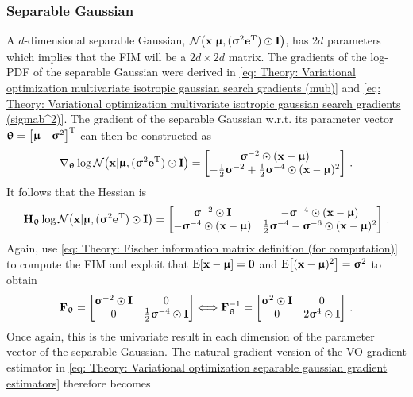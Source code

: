 \subsubsection{Separable Gaussian}
A $d$-dimensional separable Gaussian, $\mathcal{N}{\left({\mathbf{x}}|{\boldsymbol{\upmu}}, ({\boldsymbol{\upsigma}}^2{\mathbf{e}}{^\mathrm{T}})\odot{\mathbf{I}}\right)}$, has $2d$ parameters which implies that the \gls{FIM} will be a $2d\times2d$ matrix. The gradients of the log-\gls{PDF} of the separable Gaussian were derived in \eqref{eq: Theory: Variational optimization multivariate isotropic gaussian search gradients (mub)} and \eqref{eq: Theory: Variational optimization multivariate isotropic gaussian search gradients (sigmab^2)}.
The gradient of the separable Gaussian w.r.t. its parameter vector ${\boldsymbol{\uptheta}}={\begin{bmatrix}{\boldsymbol{\upmu}} & {\boldsymbol{\upsigma}}^2\end{bmatrix}}^\text{T}$ can then be constructed as
\begin{equation}
    \nabla_{\boldsymbol{\uptheta}}\log\mathcal{N}{\left({\mathbf{x}}|{\boldsymbol{\upmu}}, ({\boldsymbol{\upsigma}}^2{\mathbf{e}}{^\mathrm{T}})\odot{\mathbf{I}}\right)} = {\begin{bmatrix}{\boldsymbol{\upsigma}}^{-2} \odot ({\mathbf{x}}-{\boldsymbol{\upmu}}) \\  -\frac{1}{2}{\boldsymbol{\upsigma}}^{-2} + \frac{1}{2} {\boldsymbol{\upsigma}}^{-4}\odot({\mathbf{x}}-{\boldsymbol{\upmu}})^2\end{bmatrix}} \ .
\end{equation}
It follows that the Hessian is
\begin{equation}
    {\mathbf{H}}_{\boldsymbol{\uptheta}}\log\mathcal{N}{\left({\mathbf{x}}|{\boldsymbol{\upmu}}, ({\boldsymbol{\upsigma}}^2{\mathbf{e}}{^\mathrm{T}})\odot{\mathbf{I}}\right)} = {\begin{bmatrix}{\boldsymbol{\upsigma}}^{-2} \odot{\mathbf{I}} & -{\boldsymbol{\upsigma}}^{-4}\odot({\mathbf{x}}-{\boldsymbol{\upmu}}) \\ -{\boldsymbol{\upsigma}}^{-4}\odot({\mathbf{x}}-{\boldsymbol{\upmu}}) & \frac{1}{2}{\boldsymbol{\upsigma}}^{-4}-{\boldsymbol{\upsigma}}^{-6}\odot({\mathbf{x}}-{\boldsymbol{\upmu}})^2\end{bmatrix}} \ .
\end{equation}
Again, use \eqref{eq: Theory: Fischer information matrix definition (for computation)} to compute the \gls{FIM} and exploit that $\text{E}{\left[{\mathbf{x}}-{\boldsymbol{\upmu}}\right]}={\mathbf{0}}$ and $\text{E}{\left[({\mathbf{x}}-{\boldsymbol{\upmu}})^2\right]}={\boldsymbol{\upsigma}}^2$ to obtain
\begin{equation}
    \F_\thetab = \bmat{\sigmab^{-2}\odot\I & 0 \\ 0 & \frac{1}{2}\sigmab^{-4}\odot\I} \Longleftrightarrow \F_\thetab^{-1} = \bmat{\sigmab^{2}\odot\I & 0 \\ 0 & 2\sigmab^{4}\odot\I} \ .
\end{equation}
Once again, this is the univariate result in each dimension of the parameter vector of the separable Gaussian. The natural gradient version of the \gls{VO} gradient estimator in \eqref{eq: Theory: Variational optimization separable gaussian gradient estimators} therefore becomes
